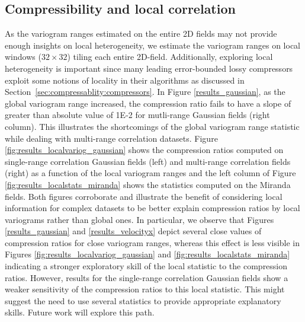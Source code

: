 \documentclass[conference]{IEEEtran}
\begin{document}
\subsection{Compressibility and local correlation}
As the variogram ranges estimated on the entire 2D fields may not provide enough insights  on local heterogeneity, we estimate the variogram ranges on local windows ($32 \times 32$) tiling each entire 2D-field. 
Additionally,  exploring local heterogeneity is important since many leading error-bounded lossy compressors exploit some notions of locality in their algorithms as discussed in
Section~\ref{sec:compressablity:compressors}. 
In Figure \ref{results_gaussian}, as the global variogram range increased, the compression ratio fails to have a slope of greater than absolute value of 1E-2 for mutli-range Gaussian fields (right column).  
This illustrates the shortcomings of the global variogram range statistic while dealing with multi-range correlation datasets. 
Figure \ref{fig:results_localvariog_gaussian} shows the compression ratios computed on single-range correlation Gaussian fields (left) and multi-range  correlation fields (right) as  a function  of the local variogram ranges and the left column of Figure  \ref{fig:results_localstats_miranda} shows the statistics computed on the Miranda fields. 
Both  figures corroborate and illustrate the benefit of considering local information for complex datasets to be better explain compression ratios by local variograms rather than global ones. 
In particular,  we observe that Figures \ref{results_gaussian} and \ref{results_velocityx} depict several close values of compression ratios for close variogram  ranges, whereas this effect is  less visible in  Figures \ref{fig:results_localvariog_gaussian} and \ref{fig:results_localstats_miranda} indicating a stronger exploratory skill of the local statistic to the compression ratios. 
However, results for  the  single-range correlation Gaussian fields show  a weaker sensitivity of  the  compression ratios  to this local  statistic. 
This might suggest the need to use several  statistics to provide appropriate explanatory skills. 
Future work will  explore this  path. 
%
\end{document}
